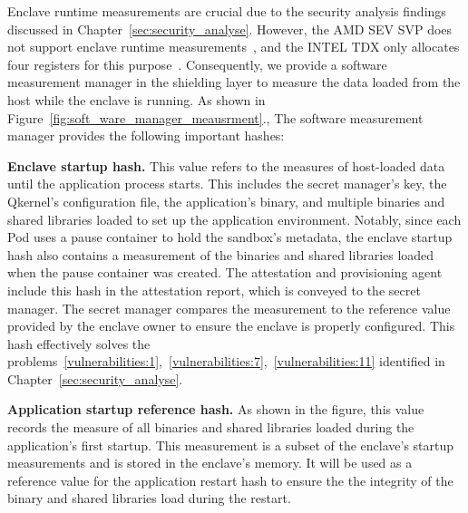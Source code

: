 Enclave runtime measurements are crucial due to the security analysis findings discussed in Chapter~\ref{sec:security_analyse}. However, the AMD SEV SVP does not support enclave runtime measurements~\cite*{snp_firmware}, and the INTEL TDX only allocates four registers for this purpose~\cite*{Intel_tdx_whitepaper}. Consequently, we provide a software measurement 
manager in the shielding layer to measure the data loaded from the host while the enclave is running. As shown in Figure~\ref{fig:soft_ware_manager_meausrment}., The software measurement manager provides the following important hashes:

\textbf{Enclave startup hash.} This value refers to the measures of host-loaded data until the application process starts. This includes the secret manager's key, the Qkernel's configuration file, the application's binary, and multiple binaries and shared libraries loaded to set up the application environment. Notably, since each Pod uses a pause container to hold the 
sandbox's metadata, the enclave startup hash also contains a measurement of the binaries and shared libraries loaded when the pause container was created. The attestation and provisioning agent include this hash in the attestation report, which is conveyed to the secret manager. The secret manager compares the measurement to the reference value provided 
by the enclave owner to ensure the enclave is properly configured. This hash effectively solves the problems~\ref{vulnerabilities:1},~\ref{vulnerabilities:7},~\ref{vulnerabilities:11} identified in Chapter~\ref{sec:security_analyse}.


\textbf{Application startup reference hash.} As shown in the figure, this value records the measure of all binaries and shared libraries loaded during the application's first startup. This measurement is a subset of the enclave's startup measurements and is stored in the enclave's memory. It will be used as a reference value for the application restart hash to ensure the 
the integrity of the binary and shared libraries load during the restart. 

